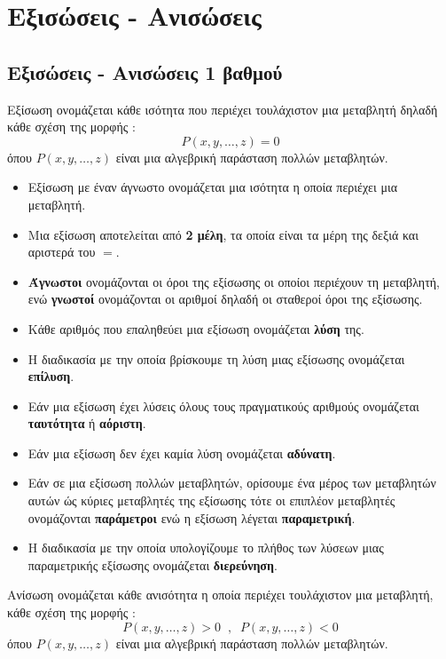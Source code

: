 \chapter{Εξισώσεις - Ανισώσεις}
\section{Εξισώσεις - Ανισώσεις 1 βαθμού}
\orismoi
{}
Εξίσωση ονομάζεται κάθε ισότητα που περιέχει τουλάχιστον μια μεταβλητή δηλαδή κάθε σχέση της μορφής :
\[ P(x,y,\ldots,z)=0 \]
όπου $ P(x,y,\ldots,z) $ είναι μια αλγεβρική παράσταση πολλών μεταβλητών.
\begin{itemize}[itemsep=0mm]
\item Εξίσωση με έναν άγνωστο ονομάζεται μια ισότητα η οποία περιέχει μια μεταβλητή.
\item Μια εξίσωση αποτελείται από \textbf{2 μέλη}, τα οποία είναι τα μέρη της δεξιά και αριστερά του $ = $.
\item \textbf{Άγνωστοι} ονομάζονται οι όροι της εξίσωσης οι οποίοι περιέχουν τη μεταβλητή, ενώ \textbf{γνωστοί} ονομάζονται οι αριθμοί δηλαδή οι σταθεροί όροι της εξίσωσης.
\item Κάθε αριθμός που επαληθεύει μια εξίσωση ονομάζεται \textbf{λύση} της.
\item Η διαδικασία με την οποία βρίσκουμε τη λύση μιας εξίσωσης ονομάζεται \textbf{επίλυση}.
\item Εάν μια εξίσωση έχει λύσεις όλους τους πραγματικούς αριθμούς ονομάζεται \textbf{ταυτότητα} ή \textbf{αόριστη}.
\item Εάν μια εξίσωση δεν έχει καμία λύση ονομάζεται \textbf{αδύνατη}.
\item Εάν σε μια εξίσωση πολλών μεταβλητών, ορίσουμε ένα μέρος των μεταβλητών αυτών ώς κύριες μεταβλητές της εξίσωσης τότε οι επιπλέον μεταβλητές ονομάζονται \textbf{παράμετροι} ενώ η εξίσωση λέγεται \textbf{παραμετρική}.
\item Η διαδικασία με την οποία υπολογίζουμε το πλήθος των λύσεων μιας παραμετρικής εξίσωσης ονομάζεται \textbf{διερεύνηση}.
\end{itemize}
Ανίσωση ονομάζεται κάθε ανισότητα η οποία περιέχει τουλάχιστον μια μεταβλητή, κάθε σχέση της μορφής :
\[ P(x,y,\ldots,z)>0\;\;,\;\;P(x,y,\ldots,z)<0 \]
όπου $ P(x,y,\ldots,z) $ είναι μια αλγεβρική παράσταση πολλών μεταβλητών.
